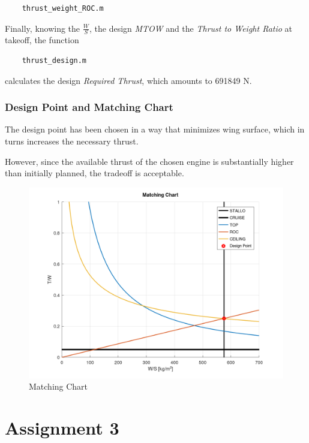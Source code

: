 \documentclass{article}
\begin{document}
\begin{verbatim}
    thrust_weight_ROC.m
\end{verbatim}

Finally, knowing the $\frac{W}{S}$, the design \textit{MTOW} and the \textit{Thrust to Weight Ratio} at takeoff, 
the function 
\begin{verbatim}
    thrust_design.m
\end{verbatim}

calculates the design \textit{Required Thrust}, which amounts to 691849 N.

\clearpage

\subsubsection{Design Point and Matching Chart\label{Matching_chart}}

The design point has been chosen in a way that minimizes wing surface, which in turns
increases the necessary thrust.

However, since the available thrust of the chosen engine is substantially higher than initially
planned, the tradeoff is acceptable.

\begin{figure}[h!]
    \centering
    \includegraphics[width=\textwidth]{Sources/Plots_and_Pictures/Matching_chart.png}
    \caption{Matching Chart}
    \label{matching_chart}
\end{figure}
\clearpage

\section{Assignment 3\label{Assignment_3}}
\end{document}
